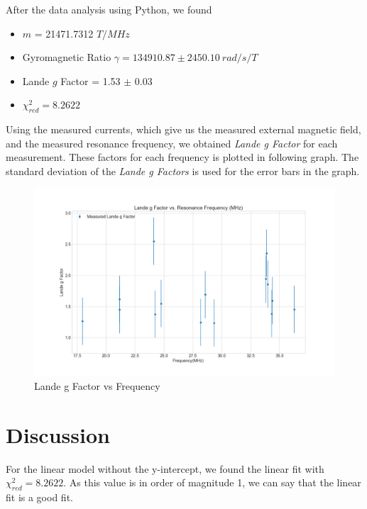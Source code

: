 \documentclass[letterpaper,12pt]{article}
\begin{document}
After the data analysis using Python, we found 
\begin{itemize}
  \item[] $m$ = 21471.7312 $T/MHz$
  \item[] Gyromagnetic Ratio $\gamma = 134910.87 \pm 2450.10\ rad/s/T$
  \item[] Lande $g$ Factor = 1.53 $\pm$ 0.03
  \item[] $\chi_{red}^2 = 8.2622$ 
\end{itemize}

Using the measured currents, which give us the measured external magnetic field, 
and the measured resonance frequency, we obtained \emph{Lande g Factor} for each measurement.
These factors for each frequency is plotted in following graph. The standard deviation
of the \emph{Lande g Factors} is used for the error bars in the graph.

\begin{figure}[H]
  \centering
  \includegraphics[width=1.0\linewidth]{../code/Pankaj/lab6_g_factor_vs_freq.png}    
  \begin{center}
    \begin{center}   
    \end{center}  \end{center}
  \caption{Lande g Factor vs Frequency}
  \label{lande-vs-frq}
\end{figure}

\section{Discussion}

For the linear model without the y-intercept, we found the linear fit with $\chi_{red}^2 = 8.2622$. As this value 
is in order of magnitude 1, we can say that the linear fit is a good fit. 
\end{document}
